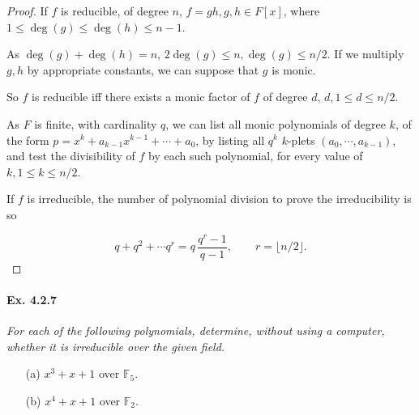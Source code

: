 \documentclass[11pt,a4paper]{article}
\newcommand{\F}{\mathbb{F}}
\begin{document}
\begin{proof}
If $f$ is reducible, of degree $n$, $f=gh, g,h\in F[x]$, where $1\leq \deg(g)\leq \deg(h) \leq n-1$.

As $\deg(g)+\deg(h) = n$, $2 \deg(g) \leq n, \deg(g) \leq n/2$.
If we multiply $g,h$ by appropriate constants, we can suppose that $g$ is monic.

So $f$ is reducible iff there exists a monic factor of $f$ of degree $d$,  $d, 1 \leq d \leq n/2$.

As $F$ is finite, with cardinality $q$, we can list all monic polynomials of degree  $k$, of the form $p=x^k+a_{k-1}x^{k-1}+\cdots+a_0$, by listing all $q^k$ $k$-plets $(a_0,\cdots,a_{k-1})$, and test the divisibility of $f$  by each such polynomial, for every value of $k, 1\leq k \leq n/2$.

If $f$ is irreducible, the number of polynomial division to prove the irreducibility is so

$$q+q^2+\cdots q^r=  q\,\frac{q^{r}-1}{q-1}, \qquad r = \lfloor n/2 \rfloor.$$
\end{proof}

\paragraph{Ex. 4.2.7}

{\it For each of the following polynomials, determine, without using a computer, whether it is irreducible over the given field.
\begin{enumerate}
\item[(a)] $x^3+x+1$ over $\F_5$.
\item[(b)] $x^4+x+1$ over $\F_2$.
\end{enumerate}
}
\end{document}

